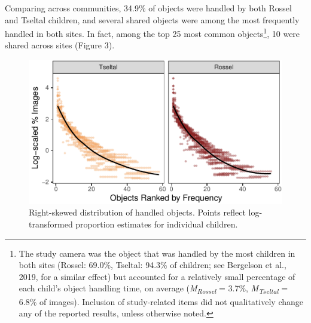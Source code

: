 \documentclass[10pt, letterpaper]{article}
\newenvironment{CodeChunk}{}{}
\begin{document}
Comparing across communities, 34.9\% of objects were handled by both
Rossel and Tseltal children, and several shared objects were among the
most frequently handled in both sites. In fact, among the top 25 most
common objects\footnote{The study camera was the object that was handled
  by the most children in both sites (Rossel: 69.0\%, Tseltal: 94.3\% of
  children; see Bergelson et al., 2019, for a similar effect) but
  accounted for a relatively small percentage of each child's object
  handling time, on average (\emph{M}\textsubscript{\emph{Rossel}} =
  3.7\%, \emph{M}\textsubscript{\emph{Tseltal}} = 6.8\% of images).
  Inclusion of study-related items did not qualitatively change any of
  the reported results, unless otherwise noted.}, 10 were shared across
sites (Figure 3).

\begin{CodeChunk}
\begin{figure}[h]

{\centering \includegraphics{figs/zipfian-objects-fig-1} 

}

\caption[Right-skewed distribution of handled objects]{Right-skewed distribution of handled objects. Points reflect log-transformed proportion estimates for individual children.}\label{fig:zipfian-objects-fig}
\end{figure}
\end{CodeChunk}
\end{document}

